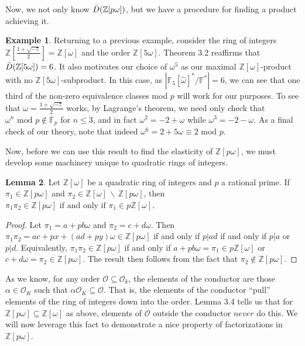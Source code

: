 \documentclass{amsart}
\theoremstyle{definition}
\newtheorem{lem}{Lemma}[section]
\newtheorem{ex}[lem]{Example}
\newcommand{\MO}{\mathcal{O}}
\newcommand{\bbz}{\mathbb{Z}}
\newcommand{\bbf}{\mathbb{F}}
\renewcommand{\leq}{\leqslant}
\numberwithin{equation}{section}
\begin{document}
Now, we not only know $\Bar{D}(\bbz[p\omega])$, but we have a procedure for finding a product achieving it. 

\begin{ex}
    Returning to a previous example, consider the ring of integers $\bbz[\frac{1 + \sqrt{-7}}{2}] = \bbz[\omega]$ and the order $\bbz[5\omega]$. Theorem 3.2 reaffirms that $\Bar{D}(\bbz[5 \omega]) = 6$. It also motivates our choice of $\omega^5$ as our maximal $\bbz[\omega]$-product with no $\bbz[5\omega]$-subproduct. In this case, as $|\bbf_5[\hat{\omega}]^*/\bbf^*| = 6$, we can see that one third of the non-zero equivalence classes mod $p$ will work for our purposes. To see that $\omega = \frac{1 + \sqrt{-7}}{2}$ works, by Lagrange's theorem, we need only check that $\omega^n \text{ mod } p \notin \bbf_p$ for $n \leq 3$, and in fact $\omega^2 = -2 + \omega$ while $\omega^3 = -2 - \omega$. As a final check of our theory, note that  indeed $\omega^6 = 2 + 5\omega \equiv 2$ mod $p$. 
\end{ex}

Now, before we can use this result to find the elasticity of $\bbz[p\omega]$, we must develop some machinery unique to quadratic rings of integers.

\begin{lem}
    Let $\bbz[\omega]$ be a quadratic ring of integers and $p$ a rational prime. If $\pi_1 \in \bbz[p\omega]$ and $\pi_2  \in \bbz[\omega] \,\backslash\, \bbz[p\omega]$, then $\pi_1\pi_2 \in \bbz[p\omega] \text{ if and only if } \pi_1 \in p\bbz[\omega]$.
\end{lem}

\begin{proof}

Let $\pi_1 = a + pb\omega$ and $\pi_2 = c + d\omega$. Then $\pi_1 \pi_2 = ac + px + (ad + py)\omega \in \bbz[p\omega]$ if and only if $p \vert ad$ if and only if $p \vert a$ or $p \vert d$. Equivalently, $\pi_1 \pi_2 \in \bbz[p\omega]$ if and only if $a + pb\omega = \pi_1 \in p\bbz[\omega]$ or $c+d\omega = \pi_2 \in \bbz[p\omega]$. The result then follows from the fact that $\pi_2 \notin \bbz[p\omega]$. 
    
\end{proof}

As we know, for any order $\MO \subseteq \MO_k$, the elements of the conductor are those $\alpha \in \MO_K$ such that $\alpha \MO_K \subseteq \MO$. That is, the elements of the conductor \enquote{pull} elements of the ring of integers down into the order. Lemma 3.4 tells us that for $\bbz[p\omega] \subseteq \bbz[\omega]$ as above, elements of $\MO$ outside the conductor $\textit{never}$ do this. We will now leverage this fact to demonstrate a nice property of factorizations in $\bbz[p\omega]$. 
\end{document}
